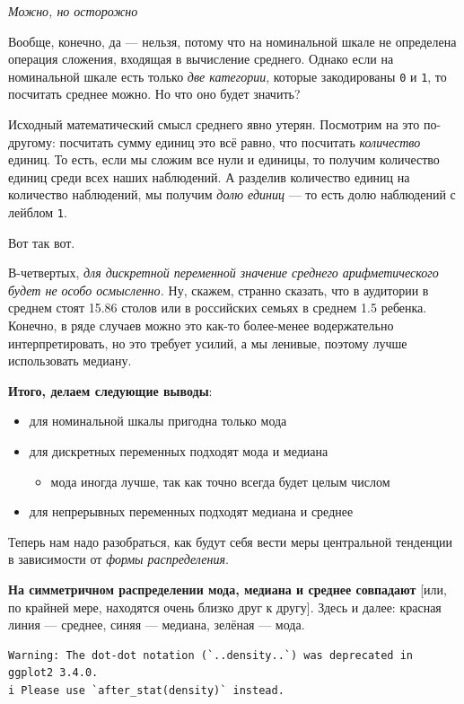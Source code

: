 \documentclass[
  letterpaper,
]{scrbook}
\providecommand{\tightlist}{%
  \setlength{\itemsep}{0pt}\setlength{\parskip}{0pt}}\usepackage{longtable,booktabs,array}
\theoremstyle{definition}
\theoremstyle{remark}
\begin{document}
\emph{Можно, но осторожно}

Вообще, конечно, да --- нельзя, потому что на номинальной шкале не
определена операция сложения, входящая в вычисление среднего. Однако
если на номинальной шкале есть только \emph{две категории}, которые
закодированы \texttt{0} и \texttt{1}, то посчитать среднее можно. Но что
оно будет значить?

Исходный математический смысл среднего явно утерян. Посмотрим на это
по-другому: посчитать сумму единиц это всё равно, что посчитать
\emph{количество} единиц. То есть, если мы сложим все нули и единицы, то
получим количество единиц среди всех наших наблюдений. А разделив
количество единиц на количество наблюдений, мы получим \emph{долю
единиц} --- то есть долю наблюдений с лейблом \texttt{1}.

Вот так вот.

В-четвертых, \emph{для дискретной переменной значение среднего
арифметического будет не особо осмысленно.} Ну, скажем, странно сказать,
что в аудитории в среднем стоят 15.86 столов или в российских семьях в
среднем 1.5 ребенка. Конечно, в ряде случаев можно это как-то
более-менее водержательно интерпретировать, но это требует усилий, а мы
ленивые, поэтому лучше использовать медиану.

\textbf{Итого, делаем следующие выводы}:

\begin{itemize}
\tightlist
\item
  для номинальной шкалы пригодна только мода
\item
  для дискретных переменных подходят мода и медиана

  \begin{itemize}
  \tightlist
  \item
    мода иногда лучше, так как точно всегда будет целым числом
  \end{itemize}
\item
  для непрерывных переменных подходят медиана и среднее
\end{itemize}

Теперь нам надо разобраться, как будут себя вести меры центральной
тенденции в зависимости от \emph{формы распределения}.

\textbf{На симметричном распределении мода, медиана и среднее совпадают}
{[}или, по крайней мере, находятся очень близко друг к другу{]}. Здесь и
далее: красная линия --- среднее, синяя --- медиана, зелёная --- мода.

\begin{verbatim}
Warning: The dot-dot notation (`..density..`) was deprecated in ggplot2 3.4.0.
i Please use `after_stat(density)` instead.
\end{verbatim}
\end{document}
